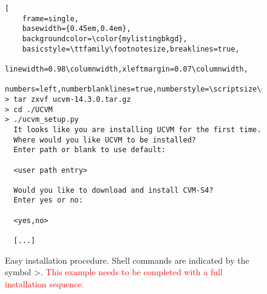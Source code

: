 
\begin{figure}[th]
\begin{lstlisting}[
	frame=single,
	basewidth={0.45em,0.4em},
	backgroundcolor=\color{mylistingbkgd},
	basicstyle=\ttfamily\footnotesize,breaklines=true,
	linewidth=0.98\columnwidth,xleftmargin=0.07\columnwidth,
	numbers=left,numberblanklines=true,numberstyle=\scriptsize\color{mylistingnclr}]
> tar zxvf ucvm-14.3.0.tar.gz
> cd ./UCVM
> ./ucvm_setup.py
  It looks like you are installing UCVM for the first time.
  Where would you like UCVM to be installed?
  Enter path or blank to use default: 

  <user path entry>

  Would you like to download and install CVM-S4?
  Enter yes or no: 

  <yes,no>

  [...]
\end{lstlisting}
\caption{Easy installation procedure. Shell commands are indicated by the symbol \textgreater. \textcolor{red}{This example needs to be completed with a full installation sequence.}}
\label{fig:instaeasy}
\end{figure}